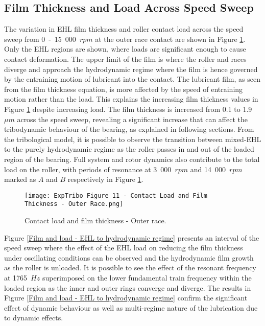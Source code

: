 \subsection{Film Thickness and Load Across Speed Sweep} 
The variation in EHL film thickness and roller contact load across the speed sweep from 0~-~15~000~$rpm$ at the outer race contact are shown in Figure \ref{Contact load and film thickness - Outer race}. Only the EHL regions are shown, where loads are significant enough to cause contact deformation. The upper limit of the film is where the roller and races diverge and approach the hydrodynamic regime where the film is hence governed by the entraining motion of lubricant into the contact. The lubricant film, as seen from the film thickness equation, is more affected by the speed of entraining motion rather than the load. This explains the increasing film thickness values in Figure \ref{Contact load and film thickness - Outer race} despite increasing load. The film thickness is increased from 0.1 to 1.9~$\mu m$ across the speed sweep, revealing a significant increase that can affect the tribodynamic behaviour of the bearing, as explained in following sections. From the tribological model, it is possible to observe the transition between mixed-EHL to the purely hydrodynamic regime as the roller passes in and out of the loaded region of the bearing. Full system and rotor dynamics also contribute to the total load on the roller, with periods of resonance at 3~000~$rpm$ and 14~000~$rpm$ marked as $A$ and $B$ respectively in Figure \ref{Contact load and film thickness - Outer race}.

\begin{figure}
	\centering
	\texttt{[image: ExpTribo Figure 11 - Contact Load and Film Thickness - Outer Race.png]}
	\caption{Contact load and film thickness - Outer race.}
	\label{Contact load and film thickness - Outer race}
\end{figure}

Figure \ref{Film and load - EHL to hydrodynamic regime} presents an interval of the speed sweep where the effect of the EHL load on reducing the film thickness under oscillating conditions can be observed and the hydrodynamic film growth as the roller is unloaded. It is possible to see the effect of the resonant frequency at 1765~$Hz$ superimposed on the lower fundamental train frequency within the loaded region as the inner and outer rings converge and diverge. The results in Figure \ref{Film and load - EHL to hydrodynamic regime} confirm the significant effect of dynamic behaviour as well as multi-regime nature of the lubrication due to dynamic effects.

